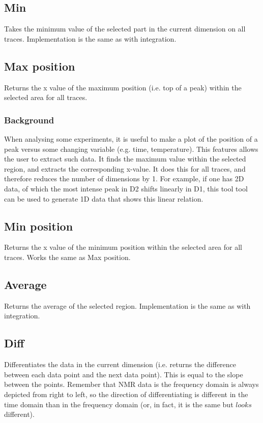 \documentclass[11pt,a4paper]{article}
\begin{document}
\subsection{Min}
Takes the minimum value of the selected part in the current dimension on all traces. Implementation is the same as with integration.

\subsection{Max position}
Returns the x value of the maximum position (i.e. top of a peak) within the selected area for all traces.

\subsubsection*{Background}
When analysing some experiments, it is useful to make a plot of the position of a peak versus some changing variable (e.g. time, temperature). This features allows the user to extract such data. It finds the maximum value within the selected region, and extracts the corresponding x-value. It does this for all traces, and therefore reduces the number of dimensions by 1. For example, if one has 2D data, of which the most intense peak in D2 shifts linearly in D1, this tool tool can be used to generate 1D data that shows this linear relation.

\subsection{Min position}
Returns the x value of the minimum position within the selected area for all traces. Works the same as Max position.

\subsection{Average}
Returns the average of the selected region. Implementation is the same as with integration.

\subsection{Diff}
Differentiates the data in the current dimension (i.e. returns the difference between each data point and the next data point). This is equal to the slope between the points. Remember that NMR data is the frequency domain is always depicted from right to left, so the direction of differentiating is different in the time domain than in the frequency domain (or, in fact, it is the same but $looks$ different).
\end{document}

